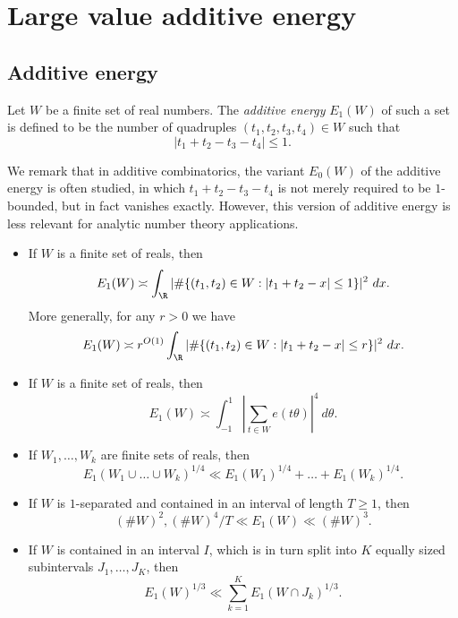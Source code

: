 
\chapter{Large value additive energy}\label{energy-chapter}

\section{Additive energy}

\begin{definition}\label{energy-def}  Let $W$ be a finite set of real numbers.  The \emph{additive energy} $E_1(W)$ of such a set is defined to be the number of quadruples $(t_1,t_2,t_3,t_4) \in W$ such that
$$
|t_1 + t_2 - t_3 - t_4| \leq 1.$$
\end{definition}

We remark that in additive combinatorics, the variant $E_0(W)$ of the additive energy is often studied, in which $t_1+t_2-t_3-t_4$ is not merely required to be $1$-bounded, but in fact vanishes exactly.  However, this version of additive energy is less relevant for analytic number theory applications.

\begin{lemma}\label{add-energy}
\begin{itemize}
\item[(i)] If $W$ is a finite set of reals, then
$$ E_1(W) \asymp \int_\R |\# \{ (t_1,t_2) \in W: |t_1+t_2 - x| \leq 1\} |^2\ dx.$$
More generally, for any $r>0$ we have
$$ E_1(W) \asymp r^{O(1)} \int_\R |\# \{ (t_1,t_2) \in W: |t_1+t_2 - x| \leq r\} |^2\ dx.$$
\item[(ii)] If $W$ is a finite set of reals, then
$$ E_1(W) \asymp \int_{-1}^1 |\sum_{t \in W} e(t\theta)|^4\ d\theta.$$
\item[(iii)] If $W_1,\dots,W_k$ are finite sets of reals, then
$$ E_1(W_1 \cup \dots \cup W_k)^{1/4} \ll E_1(W_1)^{1/4} + \dots + E_1(W_k)^{1/4}.$$
\item[(iv)]  If $W$ is $1$-separated and contained in an interval of length $T \geq 1$, then
$$ (\# W)^2, (\# W)^4/T \ll E_1(W) \ll (\# W)^3.$$
\item[(v)]  If $W$ is contained in an interval $I$, which is in turn split into $K$ equally sized subintervals $J_1,\dots,J_K$, then
$$ E_1(W)^{1/3} \ll \sum_{k=1}^K E_1(W \cap J_k)^{1/3}.$$
\end{itemize}
\end{lemma}

